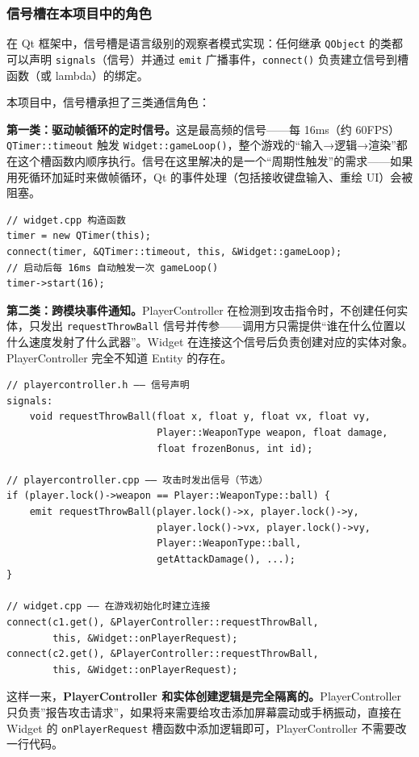 \documentclass[utf8]{ctexart}
\begin{document}
\subsubsection{信号槽在本项目中的角色}

在 Qt 框架中，信号槽是语言级别的观察者模式实现：任何继承 \texttt{QObject} 的类都可以声明 \texttt{signals}（信号）并通过 \texttt{emit} 广播事件，\texttt{connect()} 负责建立信号到槽函数（或 lambda）的绑定。

本项目中，信号槽承担了三类通信角色：

\textbf{第一类：驱动帧循环的定时信号。}这是最高频的信号——每 16ms（约 60FPS）\texttt{QTimer::timeout} 触发 \texttt{Widget::gameLoop()}，整个游戏的“输入→逻辑→渲染”都在这个槽函数内顺序执行。信号在这里解决的是一个“周期性触发”的需求——如果用死循环加延时来做帧循环，Qt 的事件处理（包括接收键盘输入、重绘 UI）会被阻塞。

\begin{verbatim}
// widget.cpp 构造函数
timer = new QTimer(this);
connect(timer, &QTimer::timeout, this, &Widget::gameLoop);
// 启动后每 16ms 自动触发一次 gameLoop()
timer->start(16);
\end{verbatim}

\textbf{第二类：跨模块事件通知。}PlayerController 在检测到攻击指令时，不创建任何实体，只发出 \texttt{requestThrowBall} 信号并传参——调用方只需提供“谁在什么位置以什么速度发射了什么武器”。Widget 在连接这个信号后负责创建对应的实体对象。PlayerController 完全不知道 Entity 的存在。

\begin{verbatim}
// playercontroller.h —— 信号声明
signals:
    void requestThrowBall(float x, float y, float vx, float vy,
                          Player::WeaponType weapon, float damage,
                          float frozenBonus, int id);

// playercontroller.cpp —— 攻击时发出信号（节选）
if (player.lock()->weapon == Player::WeaponType::ball) {
    emit requestThrowBall(player.lock()->x, player.lock()->y,
                          player.lock()->vx, player.lock()->vy,
                          Player::WeaponType::ball,
                          getAttackDamage(), ...);
}

// widget.cpp —— 在游戏初始化时建立连接
connect(c1.get(), &PlayerController::requestThrowBall,
        this, &Widget::onPlayerRequest);
connect(c2.get(), &PlayerController::requestThrowBall,
        this, &Widget::onPlayerRequest);
\end{verbatim}

这样一来，\textbf{PlayerController 和实体创建逻辑是完全隔离的。}PlayerController 只负责”报告攻击请求”，如果将来需要给攻击添加屏幕震动或手柄振动，直接在 Widget 的 \texttt{onPlayerRequest} 槽函数中添加逻辑即可，PlayerController 不需要改一行代码。
\end{document}
